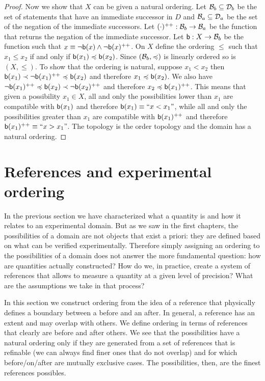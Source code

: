 \documentclass[11pt,letterpaper,fleqn]{memoir} %
\begin{document}
\begin{mathSection}
\begin{proof}
	Now we show that $X$ can be given a natural ordering. Let $\basis_b \subseteq \edomain_b$ be the set of statements that have an immediate successor in $D$ and $\basis_a \subseteq \edomain_a$ be the set of the negation of the immediate successors. Let $(\cdot)^{++} : \basis_b \to \basis_a$ be the function that returns the negation of the immediate successor. Let $\stmt[b] : X \to \basis_b$ be the function such that $x \equiv \NOT \stmt[b](x) \AND \NOT \stmt[b](x) ^{++}$. On $X$ define the ordering $\leq$ such that $x_1 \leq x_2$ if and only if $\stmt[b](x_1) \narrower \stmt[b](x_2)$. Since $(\basis_b, \narrower)$ is linearly ordered so is $(X, \leq)$. To show that the ordering is natural, suppose $x_1 < x_2$ then $\stmt[b](x_1) \snarrower \NOT \stmt[b](x_1) ^{++} \narrower \stmt[b](x_2)$ and therefore $x_1 \narrower \stmt[b](x_2)$. We also have $\NOT \stmt[b](x_1) ^{++} \narrower \stmt[b](x_2) \snarrower \NOT \stmt[b](x_2) ^{++}$ and therefore $x_2 \narrower \stmt[b](x_1) ^{++}$. This means that given a possibility $x_1 \in X$, all and only the possibilities lower than $x_1$ are compatible with $\stmt[b](x_1)$ and therefore $\stmt[b](x_1) \equiv ``x < x_1"$, while all and only the possibilities greater than $x_1$ are compatible with $\stmt[b](x_1)^{++}$ and therefore $\stmt[b](x_1)^{++} \equiv ``x > x_1"$. The topology is the order topology and the domain has a natural ordering.
\end{proof}

\end{mathSection}

\section{References and experimental ordering}

In the previous section we have characterized what a quantity is and how it relates to an experimental domain. But as we saw in the first chapters, the possibilities of a domain are not objects that exist a priori: they are defined based on what can be verified experimentally. Therefore simply assigning an ordering to the possibilities of a domain does not answer the more fundamental question: how are quantities actually constructed? How do we, in practice, create a system of references that allows to measure a quantity at a given level of precision? What are the assumptions we take in that process?

In this section we construct ordering from the idea of a reference that physically defines a boundary between a before and an after. In general, a reference has an extent and may overlap with others. We define ordering in terms of references that clearly are before and after others. We see that the possibilities have a natural ordering only if they are generated from a set of references that is refinable (we can always find finer ones that do not overlap) and for which before/on/after are mutually exclusive cases. The possibilities, then, are the finest references possibles.
\end{document}
